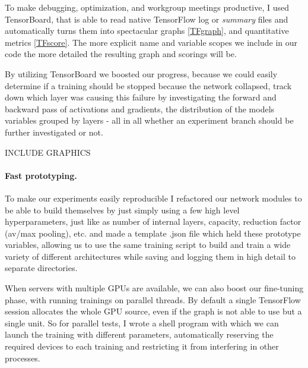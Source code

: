 To make debugging, optimization, and workgroup meetings productive, I used TensorBoard, that is able to read native TensorFlow log or \textit{summary} files and automatically turns them into spectacular graphs \ref{TFgraph}, and quantitative metrics \ref{TFscore}.
The more explicit name and variable scopes we include in our code the more detailed the resulting graph and scorings will be.

By utilizing TensorBoard we boosted our progress, because we could easily determine if a training should be stopped because the network collapsed, track down which layer was causing this failure by investigating the forward and backward pass of activations and gradients, the distribution of the models variables grouped by layers - all in all whether an experiment branch should be further investigated or not.

INCLUDE GRAPHICS

\paragraph{Fast prototyping.}
To make our experiments easily reproducible I refactored our network modules to be able to build themselves by just simply using a few high level hyperparameters, just like as number of internal layers, capacity, reduction factor (av/max pooling), etc. and made a template .json file which held these prototype variables, allowing us to use the same training script to build and train a wide variety of different architectures while saving and logging them in high detail to separate directories.

When servers with multiple GPUs are available, we can also boost our fine-tuning phase, with running trainings on parallel threads.
By default a single TensorFlow session allocates the whole GPU source, even if the graph is not able to use but a single unit.
So for parallel tests, I wrote a shell program with which we can launch the training with different parameters, automatically reserving the required devices to each training and restricting it from interfering in other processes.

